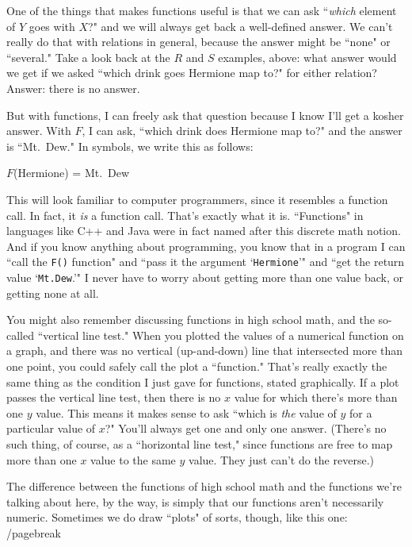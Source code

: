 One of the things that makes functions useful is that we can ask
``\textit{which} element of $Y$ goes with $X$?" and we will always get back
a well-defined answer. We can't really do that with relations in general,
because the answer might be ``none" or ``several." Take a look back at the
$R$ and $S$ examples, above: what answer would we get if we asked ``which
drink goes Hermione map to?" for either relation?  Answer: there is no
answer.

But with functions, I can freely ask that question because I know I'll get
a kosher answer. With $F$, I can ask, ``which drink does Hermione map to?"
and the answer is ``Mt.~Dew." In symbols, we write this as follows:

\begin{center}
$F$(Hermione) = Mt.~Dew
\end{center}

This will look familiar to computer programmers, since it resembles a
function call. In fact, it \textit{is} a function call. That's exactly what
it is. ``Functions" in languages like C++ and Java were in fact named after
this discrete math notion. And if you know anything about programming, you
know that in a program I can ``call the \texttt{F()} function" and ``pass
it the argument `\texttt{Hermione}'" and ``get the return value
`\texttt{Mt.Dew}.'" I never have to worry about getting more than one value
back, or getting none at all.

You might also remember discussing functions in high school math, and the
so-called ``vertical line test." When you plotted the values of a numerical
function on a graph, and there was no vertical (up-and-down) line that
intersected more than one point, you could safely call the plot a
``function." That's really exactly the same thing as the condition I just
gave for functions, stated graphically. If a plot passes the vertical line
test, then there is no $x$ value for which there's more than one $y$ value.
This means it makes sense to ask ``which is \textit{the} value of $y$ for a
particular value of $x$?" You'll always get one and only one answer.
(There's no such thing, of course, as a ``horizontal line test," since
functions are free to map more than one $x$ value to the same $y$ value.
They just can't do the reverse.)

The difference between the functions of high school math and the functions
we're talking about here, by the way, is simply that our functions aren't
necessarily numeric. Sometimes we do draw ``plots" of sorts, though, like
this one:
/pagebreak

